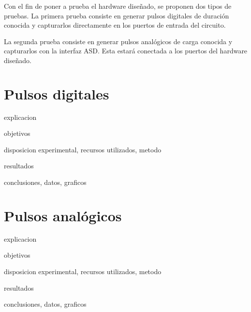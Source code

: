 Con el fin de poner a prueba el hardware diseñado, se proponen dos tipos de pruebas. 
La primera prueba consiste en generar pulsos digitales de duración conocida y capturarlos directamente en los puertos de entrada del circuito.

La segunda prueba consiste en generar pulsos analógicos de carga conocida y capturarlos con la interfaz ASD. Esta estará conectada a los puertos del hardware diseñado.

\section{Pulsos digitales}
explicacion

objetivos

disposicion experimental, recursos utilizados, metodo

resultados

conclusiones, datos, graficos


\section{Pulsos analógicos}

explicacion

objetivos

disposicion experimental, recursos utilizados, metodo

resultados

conclusiones, datos, graficos
